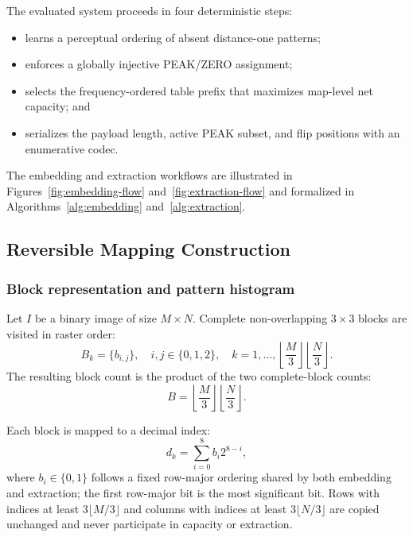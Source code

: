 \RevisionAddBegin
The evaluated system proceeds in four deterministic steps:
\RevisionAddEnd
\begin{itemize}
    \item learns a perceptual ordering of absent distance-one patterns;
    \item enforces a globally injective PEAK/ZERO assignment;
\RevisionAddBegin
    \item selects the frequency-ordered table prefix that maximizes map-level
    net capacity; and
\RevisionAddEnd
    \item serializes the payload length, active PEAK subset, and flip positions
    with an enumerative codec.
\end{itemize}

The embedding and extraction workflows are illustrated in
Figures~\ref{fig:embedding-flow} and~\ref{fig:extraction-flow} and formalized
in Algorithms~\ref{alg:embedding} and~\ref{alg:extraction}.

\subsection{Reversible Mapping Construction}

\subsubsection*{Block representation and pattern histogram}

Let $I$ be a binary image of size $M\times N$. Complete non-overlapping
$3\times3$ blocks are visited in raster order:
\begin{equation}
B_k=\{b_{i,j}\},\quad i,j\in\{0,1,2\},\quad
k=1,\ldots,\left\lfloor\frac{M}{3}\right\rfloor
\left\lfloor\frac{N}{3}\right\rfloor .
\label{eq:block-index}
\end{equation}
The resulting block count is the product of the two complete-block counts:
\begin{equation}
B=\left\lfloor\frac{M}{3}\right\rfloor
  \left\lfloor\frac{N}{3}\right\rfloor .
\label{eq:block-count}
\end{equation}

Each block is mapped to a decimal index:
\begin{equation}
d_k = \sum_{i=0}^{8} b_i 2^{8-i},
\label{eq:pattern-index}
\end{equation}
where $b_i \in \{0,1\}$ follows a fixed row-major ordering shared by both
embedding and extraction; the first row-major bit is the most significant bit.
Rows with indices at least $3\lfloor M/3\rfloor$ and columns with indices at
least $3\lfloor N/3\rfloor$ are copied unchanged and never participate in
capacity or extraction.

